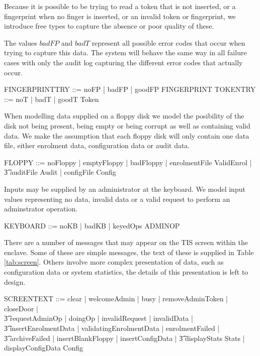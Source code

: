 Because it is possible to be trying to read a token that is not inserted,
or a fingerprint when no finger is inserted,
or an invalid token or fingerprint, 
we introduce free types to capture the absence or poor quality of these.

The values $badFP$ and $badT$ represent all possible error codes that
occur when trying to capture this data. The system will behave the
same way in all failure cases with only the audit log capturing the
different error codes that actually occur.
\begin{zed}
	FINGERPRINTTRY ::= noFP | badFP | goodFP \ldata FINGERPRINT \rdata
\also
	TOKENTRY ::= noT | badT | goodT \ldata Token \rdata
\end{zed}

When modelling data supplied on a floppy disk we model the posibility
of the disk not being present, being empty or being corrupt as well as
containing valid data.
We make the assumption that each floppy disk will only contain one
data file, either enrolment data, configuration data or audit data.

\begin{zed}
       FLOPPY ::=  noFloppy | emptyFloppy | badFloppy | 
       enrolmentFile \ldata ValidEnrol \rdata |
\\ \t3    auditFile \ldata \finset Audit \rdata |
          configFile \ldata Config \rdata
\end{zed}

Inputs may be supplied by an administrator at the keyboard. We model
input values representing no data, invalid data or a valid request to
perform an adminstrator operation.

\begin{zed}
        KEYBOARD ::= noKB | badKB | keyedOps \ldata ADMINOP \rdata 
\end{zed}

There are a number of messages that may appear on the TIS screen
within the enclave. Some of these are simple messages, the text of these
is supplied in Table \ref{tab:screen}. 
Others involve more complex presentation of data, such as
configuration data or system statistics, the details of this
presentation is left to design.

\begin{zed}
       SCREENTEXT ::= clear | welcomeAdmin | busy | removeAdminToken |
       closeDoor |
\\ \t3          requestAdminOp | doingOp | invalidRequest | invalidData |
\\ \t3          insertEnrolmentData | validatingEnrolmentData |
       enrolmentFailed |
\\ \t3          archiveFailed | insertBlankFloppy | insertConfigData |
\also 
        \t3  displayStats \ldata Stats \rdata | 
        displayConfigData \ldata Config \rdata
\end{zed}

